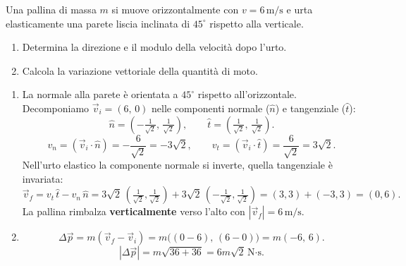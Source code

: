\begin{question}[ID=4.3, subtitle={Riflessione elastica su parete inclinata di 45°}, tags={urti nel piano, energia cinetica}, difficulty=difficile]
Una pallina di massa \(m\) si muove orizzontalmente con \(v = 6 \, \text{m/s}\) e urta elasticamente una parete liscia inclinata di \(45^\circ\) rispetto alla verticale.
\begin{enumerate}
    \item Determina la direzione e il modulo della velocità dopo l'urto.
    \item Calcola la variazione vettoriale della quantità di moto.
\end{enumerate}
\begin{solution}
    \begin{enumerate}
        \item La normale alla parete è orientata a \(45^\circ\) rispetto all'orizzontale.
        Decomponiamo \(\vec{v}_i = (6,\,0)\) nelle componenti normale (\(\hat{n}\)) e tangenziale (\(\hat{t}\)):
        \[
            \hat{n} = (-\tfrac{1}{\sqrt{2}},\,\tfrac{1}{\sqrt{2}}), \qquad \hat{t} = (\tfrac{1}{\sqrt{2}},\,\tfrac{1}{\sqrt{2}}).
        \]
        \[
            v_n = (\vec{v}_i \cdot \hat{n}) = -\frac{6}{\sqrt{2}} = -3\sqrt{2}, \qquad v_t = (\vec{v}_i \cdot \hat{t}) = \frac{6}{\sqrt{2}} = 3\sqrt{2}.
        \]
        Nell'urto elastico la componente normale si inverte, quella tangenziale è invariata:
        \[
            \vec{v}_f = v_t\,\hat{t} - v_n\,\hat{n}
            = 3\sqrt{2}\,(\tfrac{1}{\sqrt{2}},\tfrac{1}{\sqrt{2}}) + 3\sqrt{2}\,(-\tfrac{1}{\sqrt{2}},\tfrac{1}{\sqrt{2}})
            = (3,3) + (-3,3) = (0,6).
        \]
        La pallina rimbalza \textbf{verticalmente} verso l'alto con \(|\vec{v}_f| = 6 \, \text{m/s}\). \checkmark
        \item
        \[
            \Delta\vec{p} = m(\vec{v}_f - \vec{v}_i) = m\bigl((0-6),\,(6-0)\bigr) = m(-6,\,6).
        \]
        \[
            |\Delta\vec{p}| = m\sqrt{36+36} = 6m\sqrt{2} \, \text{N·s}.
        \]
    \end{enumerate}
\end{solution}
\end{question}


